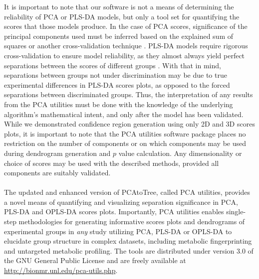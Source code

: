 \begin{doublespace}
It is important to note that our software is not a means of determining the
reliability of PCA or PLS-DA models, but only a tool set for quantifying the
scores that those models produce. In the case of PCA scores, significance of
the principal components used must be inferred based on the explained sum of
squares or another cross-validation technique
\cite{eastment:tech1982,krzanowski:biom1987}. PLS-DA models require
rigorous cross-validation to ensure model reliability, as they almost always
yield perfect separations between the scores of different groups
\cite{kjeldahl:jchemo2010}. With that in mind, separations between
groups not under discrimination may be due to true experimental differences in
PLS-DA scores plots, as opposed to the forced separations between discriminated
groups. Thus, the interpretation of any results from the PCA utilities must be
done with the knowledge of the underlying algorithm's mathematical intent, and
only after the model has been validated. While we demonstrated confidence
region generation using only 2D and 3D scores plots, it is important to note
that the PCA utilities software package places no restriction on the number of
components or on which components may be used during dendrogram generation and
$p$ value calculation. Any dimensionality or choice of scores may be used with
the described methods, provided all components are suitably validated.
\\\\
The updated and enhanced version of PCAtoTree, called PCA utilities, provides
a novel means of quantifying and visualizing separation significance in PCA,
PLS-DA and OPLS-DA scores plots. Importantly, PCA utilities enables single-step
methodologies for generating informative scores plots and dendrograms of
experimental groups in {\it any} study utilizing PCA, PLS-DA or OPLS-DA to
elucidate group structure in complex datasets, including metabolic
fingerprinting and untargeted metabolic profiling. The tools are distributed
under version 3.0 of the GNU General Public License \cite{gpl3} and are freely
available at \url{http://bionmr.unl.edu/pca-utils.php}.
\end{doublespace}




